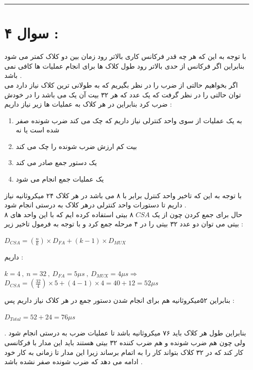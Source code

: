 \documentclass{article}
\begin{document}
\hrule

\section*{سوال ۴ : }
با توجه به این که هر چه قدر فرکانس کاری بالاتر رود زمان بین دو کلاک کمتر می شود بنابراین اگر فرکانس از حدی بالاتر رود طول کلاک ها برای انجام عملیات ها کافی نمی باشد  . \\
اگر بخواهیم حالتی از ضرب را در نظر بگیریم که به طولانی ترین کلاک نیاز دارد می توان حالتی را در نظر گرفت که یک عدد که هر ۳۲ بیت آن یک می باشد را در خودش ضرب کرد بنابراین در هر کلاک به عملیات ها زیر نیاز داریم  :‌
\begin{center}
	\begin{enumerate}
		\item به یک عملیات از سوی واحد کنترلی نیاز داریم که چک می کند ضرب شونده صفر شده است یا نه 
		\item بیت کم ارزش ضرب شونده را چک می کند 
		\item یک دستور جمع صادر می کند 
		\item یک عملیات جمع انجام می شود  
	\end{enumerate}
\end{center}
با توجه به این که تاخیر واحد کنترل برابر با ۸ می باشد در هر کلاک ۲۴ میکروثانیه نیاز داریم تا دستورات واحد کنترلی درهر کلاک به درستی انجام شود . \\
حال برای جمع کردن چون از یک 
$CSA$
۸ بیتی استفاده کرده ایم که با این واحد های ۸ بیتی می توان دو عدد ۳۲ بیتی را در ۴ مرحله جمع کرد و با توجه به فرمول  تاخیر زیر  : 
\begin{center}
	$ D_{CSA} = (\frac{n}{k}) \times D_{FA} + (k-1)\times D_{MUX}$
\end{center}
داریم  :  
\begin{center}
	$ k =  4 \  , \ n = 32 \ , \ D_{FA} = 5 \mu s \ , \ D_{MUX} = 4 \mu s \Rightarrow$\\
	$D_{CSA} = (\frac{32}{4})\times 5 + (4-1)\times 4  = 40 + 12 = 52 \mu s$
\end{center}

بنابراین ۵۲میکروثانیه هم برای انجام شدن دستور جمع در هر کلاک نیاز داریم پس  : 
\begin{center}
	$D_{Total} = 52 + 24 = 76 \mu s $
\end{center}
بنابراین طول هر کلاک باید ۷۶ میکروثانیه باشد تا  عملیات ضرب به درستی  انجام شود . ولی چون هم ضرب شونده و هم ضرب کننده ۳۲ بیتی هستند باید این مدار با فرکانسی کار کند که در ۳۲ کلاک بتواند کار را به اتمام برساند زیرا این مدار تا زمانی به کار خود ادامه می دهد که ضرب شونده صفر نشده باشد . \\
\end{document}
